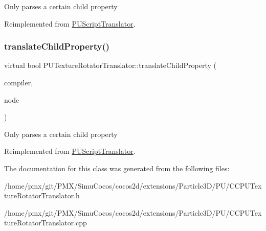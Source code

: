 Only parses a certain child property 

Reimplemented from \hyperlink{classPUScriptTranslator_a0374d83a8a04e57918975d525e0f8fe8}{P\+U\+Script\+Translator}.

\mbox{\label{classPUTextureRotatorTranslator_a08dc728727c7ecff7c8b1f8fd07795da}} 
\subsubsection{\texorpdfstring{translate\+Child\+Property()}{translateChildProperty()}\hspace{0.1cm}{\footnotesize\ttfamily [2/2]}}
{\footnotesize\ttfamily virtual bool P\+U\+Texture\+Rotator\+Translator\+::translate\+Child\+Property (\begin{DoxyParamCaption}\item[{\hyperlink{classPUScriptCompiler}{P\+U\+Script\+Compiler} $\ast$}]{compiler,  }\item[{\hyperlink{classPUAbstractNode}{P\+U\+Abstract\+Node} $\ast$}]{node }\end{DoxyParamCaption})\hspace{0.3cm}{\ttfamily [virtual]}}

Only parses a certain child property 

Reimplemented from \hyperlink{classPUScriptTranslator_a0374d83a8a04e57918975d525e0f8fe8}{P\+U\+Script\+Translator}.



The documentation for this class was generated from the following files\+:\begin{DoxyCompactItemize}
\item 
/home/pmx/git/\+P\+M\+X/\+Simu\+Cocos/cocos2d/extensions/\+Particle3\+D/\+P\+U/C\+C\+P\+U\+Texture\+Rotator\+Translator.\+h\item 
/home/pmx/git/\+P\+M\+X/\+Simu\+Cocos/cocos2d/extensions/\+Particle3\+D/\+P\+U/C\+C\+P\+U\+Texture\+Rotator\+Translator.\+cpp\end{DoxyCompactItemize}
